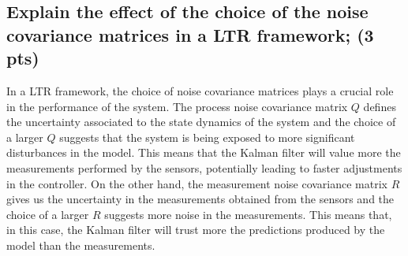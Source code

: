 \subsection{Explain the effect of the choice of the noise covariance matrices in a LTR framework; (3 pts)}
\vspace{10pt}


In a LTR framework, the choice of noise covariance matrices plays a crucial role in the performance of the system. The process noise covariance matrix $Q$ defines the uncertainty associated to the state dynamics of the system and the choice of a larger $Q$ suggests that the system is being exposed to more significant disturbances in the model. This means that the Kalman filter will value more the measurements performed by the sensors, potentially leading to faster adjustments in the controller. On the other hand, the measurement noise covariance matrix $R$ gives us the uncertainty in the measurements obtained from the sensors and the choice of a larger $R$ suggests more noise in the measurements. This means that, in this case, the Kalman filter will trust more the predictions produced by the model than the measurements.